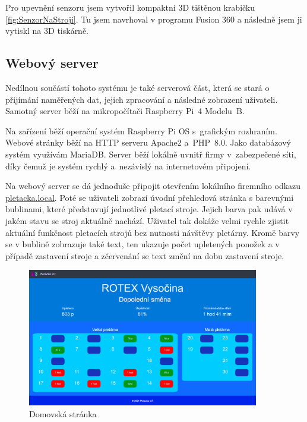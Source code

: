 \documentclass[12pt, a4paper]{article}
\begin{document}
Pro upevnění senzoru jsem vytvořil kompaktní 3D tištěnou krabičku \ref{fig:SenzorNaStroji}. 
Tu jsem navrhoval v programu Fusion 360 a následně jsem ji vytiskl na 3D tiskárně.


\subsection*{Webový server}

Nedílnou součástí tohoto systému je také serverová část, která se stará o přijímání naměřených dat, jejich zpracování a následné zobrazení uživateli.
Samotný server běží na mikropočítači Raspberry Pi~4 Modelu~B.

Na zařízení běží operační systém Raspberry Pi OS s~grafickým rozhraním.
Webové stránky běží na HTTP serveru Apache2 a~PHP~8.0.
Jako databázový systém využívám MariaDB.
Server běží lokálně uvnitř firmy v~zabezpečené síti, díky čemuž je systém rychlý a~nezávislý na internetovém připojení.

Na webový server se dá jednoduše připojit otevřením lokálního firemního odkazu \href{http://pletacka.local}{pletacka.local}.
Poté se uživateli zobrazí úvodní přehledová stránka s barevnými bublinami, které představují jednotlivé pletací stroje.
Jejich barva pak udává v jakém stavu se stroj aktuálně nachází. Uživatel tak dokáže velmi rychle zjistit aktuální funkčnost pletacích strojů bez nutnosti návštěvy pletárny.
Kromě barvy se v bublině zobrazuje také text, ten ukazuje počet upletených ponožek a v případě zastavení stroje a zčervenání se text změní na dobu zastavení stroje.

\begin{figure}[t]
    \centering
    \includegraphics[width=0.9\textwidth]{img/Uvod.png}
    \caption{Domovská stránka}
    \label{fig:webUvod}
\end{figure}
\end{document}
